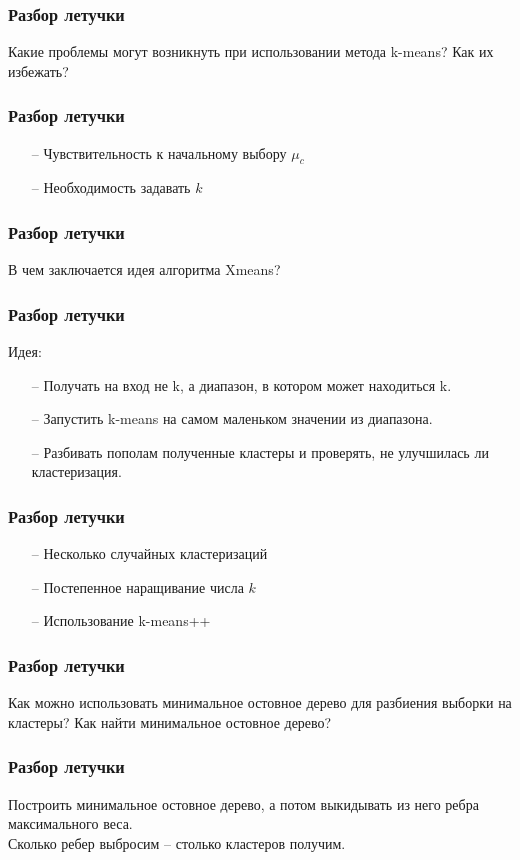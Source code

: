 \documentclass[12pt]{beamer}
\subtitle{Лекция 5. Линейные методы классификации.}
\begin{document}
	
\frame{\titlepage}

\begin{frame}\frametitle{Разбор летучки}
Какие проблемы могут возникнуть при использовании метода k-means? Как их избежать?
\end{frame}

\begin{frame}\frametitle{Разбор летучки}
\begin{itemize}
\item[--] Чувствительность к начальному выбору $\mu_c$
\item[--] Необходимость задавать $k$
\end{itemize}
\end{frame}

\begin{frame}\frametitle{Разбор летучки}
В чем заключается идея алгоритма Xmeans?
\end{frame}

\begin{frame}\frametitle{Разбор летучки}
Идея:\\
\begin{itemize}
\item[--] Получать на вход не k, а диапазон, в котором может находиться k.
\item[--] Запустить k-means на самом маленьком значении из диапазона.
\item[--] Разбивать пополам полученные кластеры и проверять, не улучшилась ли кластеризация.
\end{itemize}
\end{frame}

\begin{frame}\frametitle{Разбор летучки}
\begin{itemize}
\item[--] Несколько случайных кластеризаций
\item[--] Постепенное наращивание числа $k$
\item[--] Использование k-means++
\end{itemize}
\end{frame}

\begin{frame}\frametitle{Разбор летучки}
Как можно использовать минимальное остовное дерево для разбиения выборки на кластеры? Как найти минимальное остовное дерево?
\end{frame}

\begin{frame}\frametitle{Разбор летучки}
Построить минимальное остовное дерево, а потом выкидывать из него ребра максимального веса.\\
\vspace{5mm}
Сколько ребер выбросим -- столько кластеров получим.
\end{frame}
\end{document}
